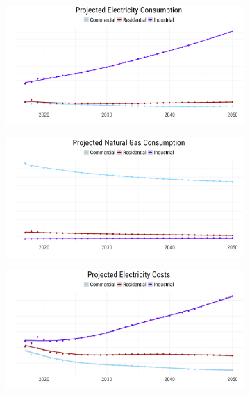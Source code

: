 \begin{figure}[H]
\centering
\begin{framed}
    \caption{Knox County Projected Energy Uses}
    \label{fig:energyElement}
     \begin{subfigure}{0.49\textwidth}
        \centering
        \includegraphics[width=\linewidth]{figures/energy_consumption_elec.png}
     \end{subfigure}
     \begin{subfigure}{0.49\textwidth}
        \centering
        \includegraphics[width=\linewidth]{figures/energy_consumption_ng.png}
     \end{subfigure}
     \begin{subfigure}{0.49\textwidth}
        \centering
        \includegraphics[width=\linewidth]{figures/energy_cost_elec.png}

\end{subfigure}
\end{framed}
\end{figure}
